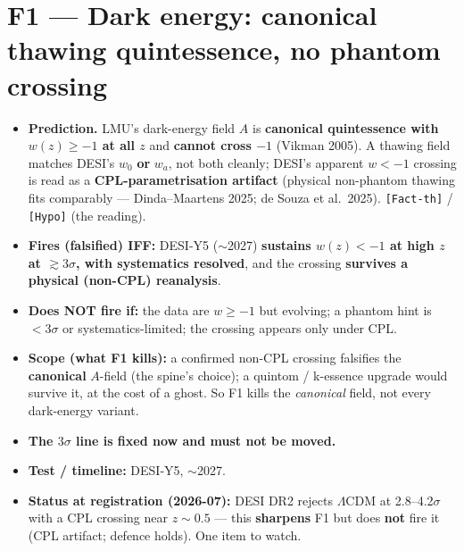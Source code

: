 \documentclass[11pt,a4paper]{article}
\newcommand{\st}[1]{\texttt{[#1]}}
\begin{document}
\section*{F1 --- Dark energy: canonical thawing quintessence, no phantom crossing}
\begin{itemize}
\item \textbf{Prediction.} LMU's dark-energy field $A$ is \textbf{canonical quintessence with $w(z)\geq-1$ at all $z$} and \textbf{cannot cross $-1$} (Vikman 2005). A thawing field matches DESI's $w_0$ \textbf{or} $w_a$, not both cleanly; DESI's apparent $w<-1$ crossing is read as a \textbf{CPL-parametrisation artifact} (physical non-phantom thawing fits comparably --- Dinda--Maartens 2025; de Souza et al.\ 2025). \st{Fact-th} / \st{Hypo} (the reading).
\item \textbf{Fires (falsified) IFF:} DESI-Y5 ($\sim$2027) \textbf{sustains $w(z)<-1$ at high $z$ at $\gtrsim3\sigma$, with systematics resolved}, and the crossing \textbf{survives a physical (non-CPL) reanalysis}.
\item \textbf{Does NOT fire if:} the data are $w\geq-1$ but evolving; a phantom hint is $<3\sigma$ or systematics-limited; the crossing appears only under CPL.
\item \textbf{Scope (what F1 kills):} a confirmed non-CPL crossing falsifies the \textbf{canonical} $A$-field (the spine's choice); a quintom / k-essence upgrade would survive it, at the cost of a ghost. So F1 kills the \emph{canonical} field, not every dark-energy variant.
\item \textbf{The $3\sigma$ line is fixed now and must not be moved.}
\item \textbf{Test / timeline:} DESI-Y5, $\sim$2027.
\item \textbf{Status at registration (2026-07):} DESI DR2 rejects $\Lambda$CDM at 2.8--4.2$\sigma$ with a CPL crossing near $z\sim0.5$ --- this \textbf{sharpens} F1 but does \textbf{not} fire it (CPL artifact; defence holds). One item to watch.
\end{itemize}
\end{document}
